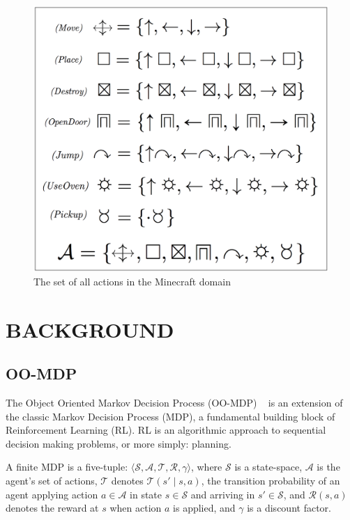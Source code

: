 \documentclass[]{article}
\begin{document}
\begin{figure}
\centering
\includegraphics[scale = 0.15]{figures/all_actions.png}
\caption{The set of all actions in the Minecraft domain \label{fig:all_actions}}
\end{figure}

\section{BACKGROUND}

\subsection{OO-MDP}

The Object Oriented Markov Decision Process (OO-MDP) ~\citep{diuk08} is an extension of the classic Markov Decision Process (MDP), a fundamental building block of Reinforcement Learning (RL). RL is an algorithmic approach to sequential decision making problems, or more simply: planning.

A finite MDP is a five-tuple: $\langle \mathcal{S}, \mathcal{A}, \mathcal{T}, \mathcal{R}, \gamma \rangle$, where $\mathcal{S}$ is a state-space, $\mathcal{A}$ is the agent's set of actions, $\mathcal{T}$ denotes $\mathcal{T}(s' \mid s,a)$, the transition probability of an agent applying action $a \in \mathcal{A}$ in state $s \in \mathcal{S}$ and arriving in $s' \in \mathcal{S}$, and $\mathcal{R}(s,a)$ denotes the reward at $s$ when action $a$ is applied, and $\gamma$ is a discount factor.
\end{document}
